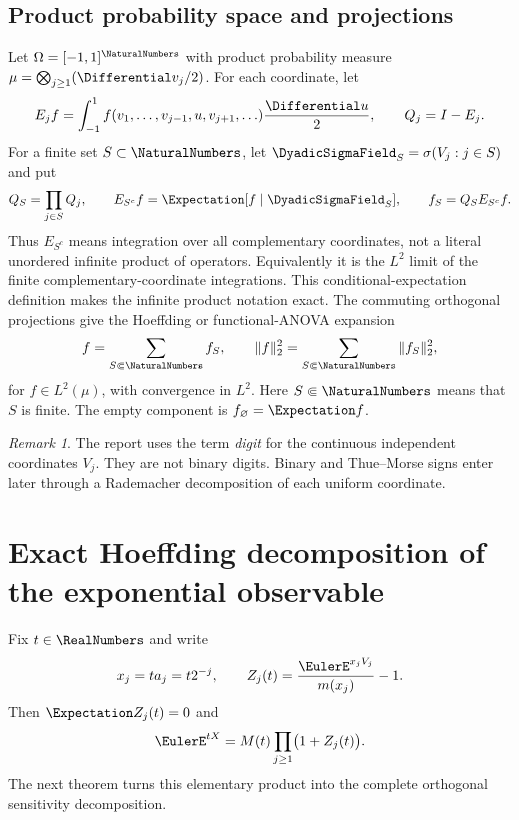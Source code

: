 \documentclass[11pt,oneside]{article}
\theoremstyle{definition}
\theoremstyle{remark}
\newtheorem{remark}[theorem]{Remark}
\begin{document}
\subsection{Product probability space and projections}

Let $\Omega=[-1,1]^{\NaturalNumbers}$ with product probability measure
$\mu=\bigotimes_{j\ge1}(\Differential v_j/2)$.  For each coordinate, let
\begin{equation}
 E_jf=\int_{-1}^1f(v_1,\ldots,v_{j-1},u,v_{j+1},\ldots)\frac{\Differential u}{2},
 \qquad Q_j=I-E_j.
 \label{eq:coordinate-projections}
\end{equation}
For a finite set $S\subset\NaturalNumbers$, let
\(\DyadicSigmaField_S=\sigma(V_j:j\in S)\) and put
\begin{equation}
 Q_S=\prod_{j\in S}Q_j,
 \qquad E_{S^c}f=\Expectation[f\mid\DyadicSigmaField_S],
 \qquad f_S=Q_SE_{S^c}f.
 \label{eq:Hoeffding-component}
\end{equation}
Thus $E_{S^c}$ means integration over all complementary coordinates, not a
literal unordered infinite product of operators.  Equivalently it is the
$L^2$ limit of the finite complementary-coordinate integrations.  This
conditional-expectation definition makes the infinite product notation exact.
The commuting orthogonal projections give the Hoeffding or functional-ANOVA
expansion
\begin{equation}
 f=\sum_{S\Subset\NaturalNumbers}f_S,
 \qquad
 \|f\|_2^2=\sum_{S\Subset\NaturalNumbers}\|f_S\|_2^2,
 \label{eq:Hoeffding-general}
\end{equation}
for $f\in L^2(\mu)$, with convergence in $L^2$.  Here $S\Subset\NaturalNumbers$ means that
$S$ is finite.  The empty component is $f_\varnothing=\Expectation f$.

\begin{remark}
The report uses the term \emph{digit} for the continuous independent
coordinates $V_j$.  They are not binary digits.  Binary and Thue--Morse signs
enter later through a Rademacher decomposition of each uniform coordinate.
\end{remark}

\section{Exact Hoeffding decomposition of the exponential observable}
\label{sec:exponential-anova}

Fix $t\in\RealNumbers$ and write
\begin{equation}
 x_j=ta_j=t2^{-j},
 \qquad
 Z_j(t)=\frac{\EulerE^{x_jV_j}}{m(x_j)}-1.
 \label{eq:Z-local}
\end{equation}
Then $\Expectation Z_j(t)=0$ and
\begin{equation}
 \EulerE^{tX}=M(t)\prod_{j\ge1}\bigl(1+Z_j(t)\bigr).
 \label{eq:exp-centered-product}
\end{equation}
The next theorem turns this elementary product into the complete orthogonal
sensitivity decomposition.
\end{document}
